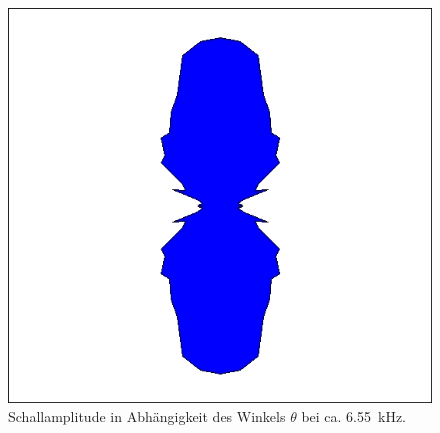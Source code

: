\begin{figure}
\centering
\includegraphics[width=\textwidth]{content/messungen/Chapter2new/2_3_5.jpg}
\caption{Schallamplitude in Abhängigkeit des Winkels $\theta$ bei ca. 6.55~kHz.}
\label{fig:2_3_5}
\end{figure}
\FloatBarrier